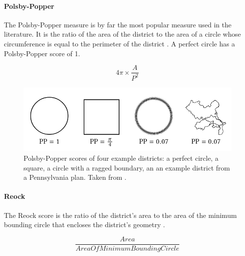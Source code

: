 \documentclass[]{article}
\let\oldparagraph\paragraph
\renewcommand{\paragraph}[1]{\oldparagraph{#1}\mbox{}}
\begin{document}
\hypertarget{polsby-popper}{%
\paragraph{Polsby-Popper}\label{polsby-popper}}

The Polsby-Popper measure is by far the most popular measure used in the
literature. It is the ratio of the area of the district to the area of a
circle whose circumference is equal to the perimeter of the district
\citep{pp1991}. A perfect circle has a Polsby-Popper score of 1.

\[4\pi \times \frac{A}{P^2}\]

\begin{figure}
\centering
\includegraphics{img/pp_example.png}
\caption{Polsby-Popper scores of four example districts: a perfect
circle, a square, a circle with a ragged boundary, an an example
district from a Pennsylvania plan. Taken from \cite{s2020}.}
\end{figure}

\hypertarget{reock}{%
\paragraph{Reock}\label{reock}}

The Reock score is the ratio of the district's area to the area of the
minimum bounding circle that encloses the district's geometry
\citep{reock1961}.

\[\frac{Area}{AreaOfMinimumBoundingCircle}\]
\end{document}
